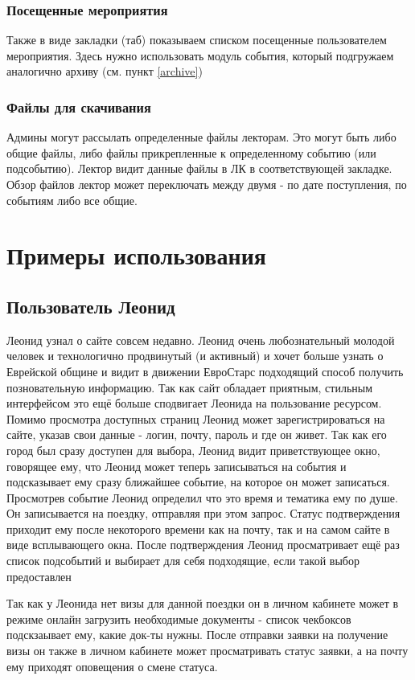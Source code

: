 \documentclass[DIV=calc, paper=a4, fontsize=11pt]{scrartcl} %
\begin{document}
\subsubsection{Посещенные мероприятия}
Также в виде закладки (таб) показываем списком посещенные пользователем мероприятия. Здесь нужно использовать модуль события, который подгружаем аналогично архиву (см. пункт \ref{archive})

\subsubsection{Файлы для скачивания}
Админы могут рассылать определенные файлы лекторам. Это могут быть либо общие файлы, либо файлы прикрепленные к определенному событию (или подсобытию). Лектор видит данные файлы в ЛК в соответствующей закладке. Обзор файлов лектор может переключать между двумя - по дате поступления, по событиям либо все общие.


\section{Примеры использования}

\begin{framed}
\subsection{Пользователь Леонид}
Леонид узнал о сайте совсем недавно. Леонид очень любознательный молодой человек и технологично продвинутый (и активный) и хочет больше узнать о Еврейской общине и видит в движении ЕвроСтарс подходящий способ получить позновательную информацию. Так как сайт обладает приятным, стильным интерфейсом это ещё больше сподвигает Леонида на пользование ресурсом.
\\[0.5cm]
Помимо просмотра доступных страниц Леонид может зарегистрироваться на сайте, указав свои данные - логин, почту, пароль и где он живет. Так как его город был сразу доступен для выбора, Леонид видит приветствующее окно, говорящее ему, что Леонид может теперь записываться на события и подсказывает ему сразу ближайшее событие, на которое он может записаться.
\\[0.5cm]
Просмотрев событие Леонид определил что это время и тематика ему по душе. Он записывается на поездку, отправляя при этом запрос. Статус подтверждения приходит ему после некоторого времени как на почту, так и на самом сайте в виде всплывающего окна. После подтверждения Леонид просматривает ещё раз список подсобытий и выбирает для себя подходящие, если такой выбор предоставлен

Так как у Леонида нет визы для данной поездки он в личном кабинете может в режиме онлайн загрузить необходимые документы - список чекбоксов подскзаывает ему, какие док-ты нужны. После отправки заявки на получение визы он также в личном кабинете может просматривать статус заявки, а на почту ему приходят оповещения о смене статуса.
\end{framed}
\end{document}
